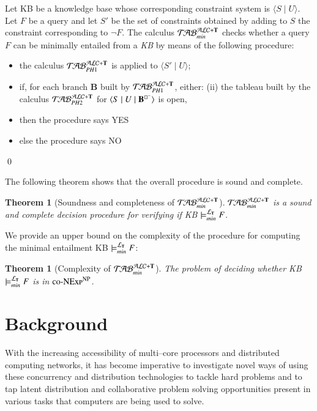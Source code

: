 \documentclass[a4paper, 11pt, oneside]{elsarticle}
\newcommand{\tip}{{\bf T}}
\newcommand{\nott} {\lnot}
\newcommand{\tc} {\mid}
\newcommand{\bbox}{\square}
\newcommand{\sx} {\langle}
\newcommand{\dx} {\rangle}
\newcommand{\ellet} {\mathcal{L}_{\bf T}}
\newcommand{\nuovoc}{\mathrel{{\mathcal{T}\!\mathcal{AB}}}_{min}^{\mathcal{ALC}+\mbox{\scriptsize $\tip$}}}
\newcommand{\primo}{\mathrel{{\mathcal{T}\!\mathcal{AB}}}_{PH 1}^{\mathcal{ALC}+\mbox{\scriptsize $\tip$}}}
\newcommand{\secondo}{\mathrel{{\mathcal{T}\!\mathcal{AB}}}_{PH 2}^{\mathcal{ALC}+\mbox{\scriptsize $\tip$}}}
\newenvironment{definition}
{\begin{defi} \rm}{\qed \end{defi}}
\newtheorem{theorem}{Theorem}
\newcounter{posu}
\newtheorem{theorem}[posu]{Theorem}
\newtheorem{definition}[posu]{Definition}
\begin{document}
\begin{definition}\label{def processo}
Let KB be a knowledge base whose corresponding constraint system is $\sx S \tc U \dx$. Let $F$ be a query and let $S'$ be the set of constraints obtained by adding to $S$ the constraint corresponding to $\nott F$.
The calculus $\nuovoc$ checks whether a query $F$ can be minimally entailed from a \emph{KB} by means of the following procedure:
\begin{itemize}
\item the calculus $\primo$ is applied to $\sx S' \tc U \dx$;
\item if, for each branch {\bf B} built by $\primo$, either:
	\subitem(ii) {the tableau built by the calculus $\secondo$ for $\sx S \tc U \tc {\bf
B}^{\bbox^{-}} \dx$ is open, }
\item[] then the procedure says \textsc{YES}
\item[] else the procedure says \textsc{NO}
\end{itemize}
\end{definition}

\noindent The following theorem shows that the overall procedure is sound and complete.

\begin{theorem}[Soundness and completeness of $\nuovoc$]\label{Soundness e completeness nuovoc} $\nuovoc$ is  a sound and complete decision procedure for verifying if KB $\models_{min}^{\ellet} F$.
\end{theorem}

We provide an upper bound on the complexity of the procedure for computing the minimal entailment KB $\models_{min}^{\ellet} F$:

\begin{theorem}[Complexity of $\nuovoc$]\label{overall_complexity}
The problem of deciding whether \emph{KB} $\models_{min}^{\ellet} F$ is in $\textsc{co-NExp}^\textsc{NP}$.
\end{theorem}


\newpage

\section{Background}\label{bg}
With the increasing accessibility of multi--core processors and distributed computing networks, it has become imperative to investigate novel ways of using these concurrency and distribution technologies to tackle hard problems and to tap latent distribution and collaborative problem solving opportunities present in various tasks that computers are being used to solve.
\end{document}
